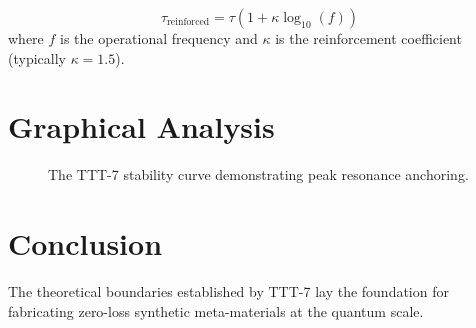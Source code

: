 \documentclass[reprint,aps,prl,twocolumn,superscriptaddress,showpacs,amsmath,amssymb]{revtex4-2}
\begin{document}
\begin{equation}
    \tau_{\text{reinforced}} = \tau \left(1 + \kappa \log_{10}(f) \right)
\end{equation}
where $f$ is the operational frequency and $\kappa$ is the reinforcement coefficient (typically $\kappa = 1.5$).

\section{Graphical Analysis}
\begin{figure}[h]
\centering
{}
\caption{The TTT-7 stability curve demonstrating peak resonance anchoring.}
\end{figure}

\section{Conclusion}
The theoretical boundaries established by TTT-7 lay the foundation for fabricating zero-loss synthetic meta-materials at the quantum scale.
\end{document}
